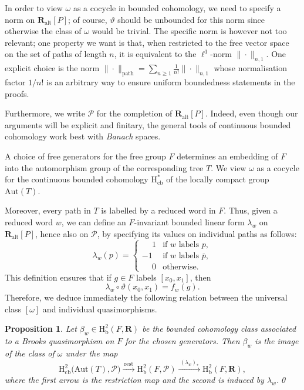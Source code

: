 \documentclass[11pt, a4paper]{amsart}
\newcommand{\RR}{\mathbf{R}}
\newcommand{\teta}{\vartheta}
\newcommand{\Aut}{\mathrm{Aut}}
\newcommand{\pathmod}{\RR_\mathrm{alt}[P]}
\newcommand{\pathban}{\mathscr{P}}
\newcommand{\pathnorm}[1]{\|#1\|_\mathrm{path}}
\newcommand{\hbc}{\mathrm{H}_\mathrm{cb}}
\newcommand{\hb}{\mathrm{H}_\mathrm{b}}
\newcommand{\ol}{\overline}
\theoremstyle{plain}
\newtheorem{prop}[thm]{Proposition}
\begin{document}
\medskip

In order to view $\omega$ as a cocycle in bounded cohomology, we need to specify a norm on $\pathmod$; of course, $\teta$ should be unbounded for this norm since otherwise the class of $\omega$ would be trivial. The specific norm is however not too relevant; one property we want is that, when restricted to the free vector space on the set of paths of length $n$, it is equivalent to the $\ell^1$-norm $\|\cdot\|_{n,1}$. One explicit choice is the norm $\pathnorm\cdot = {\sum_{n\geq 1} \frac1{n!} \|\cdot\|_{n,1}}$ whose normalisation factor $1/n!$ is an arbitrary way to ensure uniform boundedness statements in the proofs.

Furthermore, we write $\pathban$ for the completion of $\pathmod$. Indeed, even though  our arguments will be explicit and finitary, the general tools of continuous bounded cohomology work best with \emph{Banach} spaces.

\medskip

A choice of free generators for the free group $F$ determines an embedding of $F$ into the automorphism group of the corresponding tree $T$. We view $\omega$ as a cocycle for the continuous bounded cohomology $\hbc^*$ of the locally compact group $\Aut(T)$.


Moreover, every path in $T$ is labelled by a reduced word in $F$. Thus, given a reduced word $w$, we can define an $F$-invariant bounded linear form $\lambda_w$ on $\pathmod$, hence also on $\pathban$, by specifying its values on individual paths as follows:
%
$$\lambda_w(p)=\left\{ \begin{array}{ll}
\phantom{-}1& \text{if $w$ labels $p$},\\
-1 & \text{if $w$ labels $\ol p$},\\
\phantom{-}0&\text{otherwise}. 
\end{array}\right.$$
%
This definition ensures that if $g\in F$ labels $[x_0, x_1]$, then
%
$$\lambda_w\circ\teta(x_0, x_1)= f_w(g).$$
%
Therefore, we deduce immediately the following relation between the universal class $[\omega]$ and individual quasimorphisms.

\begin{prop}\label{prop:mother}
Let $\beta_w\in\hb^2(F, \RR)$ be the bounded cohomology class associated to a Brooks quasimorphism on $F$ for the chosen generators. Then $\beta_w$ is the image of the class of $\omega$ under the map
%
$$\hbc^2\big(\Aut(T), \pathban\big) \xrightarrow{\ \mathrm{rest}\ } \hb^2(F, \pathban) \xrightarrow{\ (\lambda_w)_*\ } \hb^2(F, \RR),$$
%
where the first arrow is the restriction map and the second is induced by $\lambda_w$.\qed
\end{prop}
\end{document}
